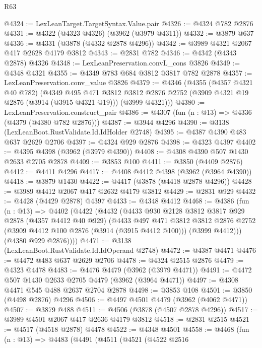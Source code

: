 \begin{lexlean}{R63}
\begin{coremodule}
@4324 := LexLeanTarget.TargetSyntax.Value.pair
@4326 := @4324 @782 @2876
@4331 := @4322 (@4323 @4326) (@3962 (@3979 @4311))
@4332 := @3879 @637
@4336 := @4331 (@3878 (@4332 @2878 @4296))
@4342 := @3989 @4321 @2067 @417 @2628 @4179 @3812
@4343 := @2831 @782
@4346 := @4342 (@4343 @2878) @4326
@4348 := LexLeanPreservation.convL_cons @3826
@4349 := @4348 @4321
@4355 := @4349 @783 @684 @3812 @3817 @782 @2878
@4357 := LexLeanPreservation.conv_value @3826
@4379 := @4346
    (@4355
      (@4357 @4321 @40 @782)
      (@4349
        @495
        @471
        @3812
        @3812
        @2876
        @2752
        (@3909 @4321 @19 @2876 (@3914 (@3915 @4321 @19)))
        (@3999 @4321)))
@4380 := LexLeanPreservation.construct_pair
@4386 := @4307 (fun (n : @13) => @4336 (@4379 (@4380 @782 @2876)))
@4387 := @3944 @4296
@4390 := @3138 (LexLeanBoot.RustValidate.Id.IdHolder @2748)
@4395 := @4387 @4390 @483 @637 @2629 @2706
@4397 := @4324 @929 @2876
@4398 := @4323 @4397
@4402 := @4395 @4398 (@3962 (@3979 @4390))
@4408 := @4308 @4390 @507 @1430 @2633 @2705 @2878
@4409 := @3853 @100
@4411 := @3850 (@4409 @2876)
@4412 := @4411 @4296
@4417 := @4408 @4412 @4398 (@3962 (@3964 @4390))
@4418 := @3879 @1430
@4422 := @4417 (@3878 (@4418 @2878 @4296))
@4428 := @3989 @4412 @2067 @417 @2632 @4179 @3812
@4429 := @2831 @929
@4432 := @4428 (@4429 @2878) @4397
@4433 := @4348 @4412
@4468 := @4386
    (fun (n : @13) =>
    @4402
      (@4422
        (@4432
          (@4433
            @930
            @2128
            @3812
            @3817
            @929
            @2878
            (@4357 @4412 @40 @929)
            (@4433
              @497
              @471
              @3812
              @3812
              @2876
              @2752
              (@3909 @4412 @100 @2876 (@3914 (@3915 @4412 @100)))
              (@3999 @4412)))
          (@4380 @929 @2876))))
@4471 := @3138 (LexLeanBoot.RustValidate.Id.IdOperand @2748)
@4472 := @4387 @4471
@4476 := @4472 @483 @637 @2629 @2706
@4478 := @4324 @2515 @2876
@4479 := @4323 @4478
@4483 := @4476 @4479 (@3962 (@3979 @4471))
@4491 := @4472 @507 @1430 @2633 @2705 @4479 (@3962 (@3964 @4471))
@4497 := @4308 @4471 @545 @488 @2637 @2704 @2878
@4498 := @3853 @108
@4501 := @3850 (@4498 @2876) @4296
@4506 := @4497 @4501 @4479 (@3962 (@4062 @4471))
@4507 := @3879 @488
@4511 := @4506 (@3878 (@4507 @2878 @4296))
@4517 := @3989 @4501 @2067 @417 @2636 @4179 @3812
@4518 := @2831 @2515
@4521 := @4517 (@4518 @2878) @4478
@4522 := @4348 @4501
@4558 := @4468
    (fun (n : @13) =>
    @4483
      (@4491
        (@4511
          (@4521
            (@4522
              @2516

\end{coremodule}
\end{lexlean}
